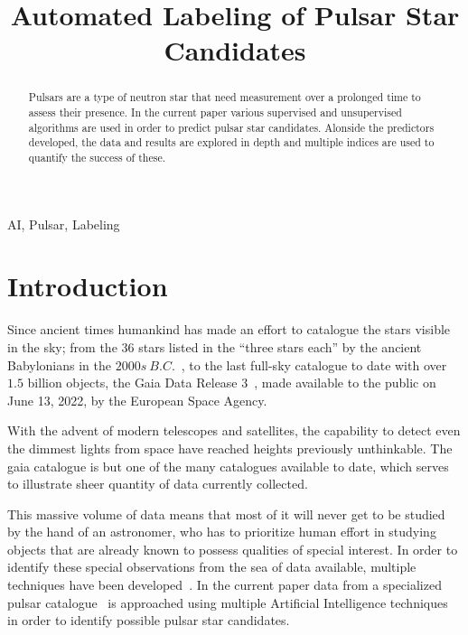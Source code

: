 \documentclass[journal]{IEEEtran}
\begin{document}
\title{Automated Labeling of Pulsar Star Candidates}

\author{
    }

\maketitle

\listoftodos

\begin{abstract}
    Pulsars are a type of neutron star that need measurement over a prolonged
    time to assess their presence. In the current paper various supervised and
    unsupervised algorithms are used in order to predict pulsar star candidates.
    Alonside the predictors developed, the data and results are explored in
    depth and multiple indices are used to quantify the success of these.
\end{abstract}

\begin{IEEEkeywords}
    AI, Pulsar, Labeling
\end{IEEEkeywords}

\section{Introduction\label{sec:intro}} 
Since ancient times humankind has made an effort to catalogue the stars visible
in the sky; from the $36$ stars listed in the ``three stars each'' by the
ancient Babylonians in the $2000s\ B.C.$~\cite{astronomy:history:north}, to the
last full-sky catalogue to date with over $1.5$ billion objects, the Gaia Data
Release 3~\cite{gaia:dr3:esa}, made available to the public on June 13, 2022, by
the European Space Agency.

With the advent of modern telescopes and satellites, the capability to detect
even the dimmest lights from space have reached heights previously unthinkable.
The gaia catalogue is but one of the many catalogues available to date, which
serves to illustrate sheer quantity of data currently collected. 

This massive volume of data means that most of it will never get to be studied
by the hand of an astronomer, who has to prioritize human effort in
studying objects that are already known to possess qualities of special interest.
In order to identify these special observations from the sea of data available,
multiple techniques have been developed~\cite{pulsar:dataset:explanation:lyon}.
In the current paper data from a specialized pulsar
catalogue~\cite{pulsar:dataset:lyon} is approached using multiple Artificial
Intelligence techniques in order to identify possible pulsar star candidates.
\end{document}
